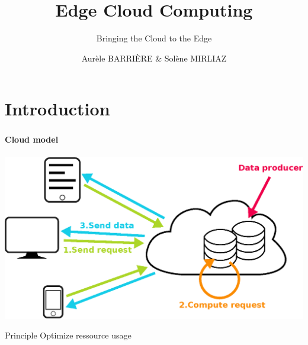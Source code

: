 \documentclass[utf8,xcolor=table, page number]{earlywinter}
\begin{document}
\title{Edge Cloud Computing}
\subtitle{Bringing the Cloud to the Edge}
\author{Aurèle BARRIÈRE & Solène MIRLIAZ}

\begin{frame}[plain]
  \titlepage%
\end{frame}

\section*{Introduction}
\begin{frame}
	\frametitle{\secname}
  \framesubtitle{Cloud model}
  \begin{center}
    \includegraphics[width=0.7\linewidth]{cloud.eps}
  \end{center}
  \begin{block}{Principle}
    Optimize ressource usage
  \end{block}
\end{frame}
\end{document}

